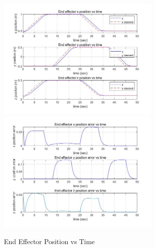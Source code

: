 \begin{figure}[htbp]
	\centering
	\includegraphics[width=8cm]{./fig/5.jpg}
	\includegraphics[width=8cm]{./fig/6.jpg}
	\caption{End Effector Position vs Time}
	\label{F 5.12}
\end{figure}

\newpage